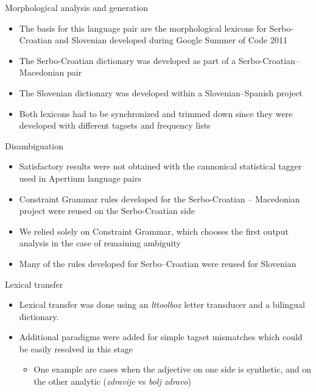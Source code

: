 \documentclass{beamer}
\begin{document}
\begin{frame}{Morphological analysis and generation}
\begin{itemize}

\item The basis for this language pair are the morphological lexicons for Serbo-Croatian and Slovenian developed during Google Summer of Code 2011
\item The Serbo-Croatian dictionary was developed as part of a Serbo-Croatian--Macedonian pair
\item The Slovenian dictionary was developed within a Slovenian--Spanish project
\item Both lexicons had to be synchronized and trimmed down since they were developed with different tagsets and frequency lists 

\end{itemize}
\end{frame}

\begin{frame}{Disambiguation}
\begin{itemize}

\item Satisfactory results were not obtained with the cannonical statistical tagger used in Apertium language pairs
\item Constraint Grammar rules developed for the Serbo-Croatian -- Macedonian project were reused on the Serbo-Croatian side 
\item We relied solely on Constraint Grammar, which chooses the first output analysis in the case of remaining ambiguity
\item Many of the rules developed for Serbo--Croatian were reused for Slovenian

\end{itemize}
\end{frame}

\begin{frame}{Lexical transfer}
\begin{itemize}

\item Lexical transfer was done using an \emph{lttoolbox} letter transducer and a bilingual dictionary.
\item Additional paradigms were added for simple tagset mismatches which could be easily resolved in this stage
\begin{itemize}
	\item One example are cases when the adjective on one side is synthetic, and on the other analytic (\emph{zdravije} vs \emph{bolj zdravo})
\end{itemize}
\end{itemize}
\end{frame}
\end{document}
